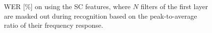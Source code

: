 \begin{figure}[htb]
	\centering
	
	\vspace{-0.3cm}
	\caption{\gls{WER} [\%] on \devother using the \gls{SC} features, where $N$ filters of the first layer are masked out during recognition based on the peak-to-average ratio of their frequency response.}
	\label{fig:masked_filters}
\end{figure}
